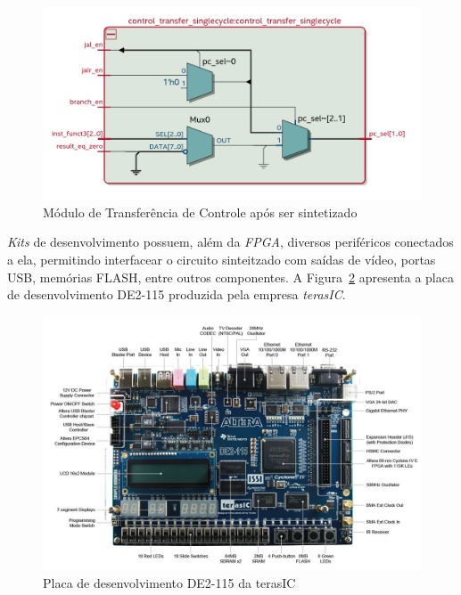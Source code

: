 \begin{figure}[H]
\centering
    \includegraphics[width=1\linewidth]{images/riscv_sinth.png}
    \caption{Módulo de Transferência de Controle após ser sintetizado
                }\label{fig:riscv_sinth}
\end{figure}

{
    \textit{Kits} de desenvolvimento possuem, além da \textit{FPGA}, diversos
    periféricos conectados a ela, permitindo interfacear o circuito sinteitzado
    com saídas de vídeo, portas USB, memórias FLASH, entre outros componentes.
    A Figura~\ref{fig:DE2_115} apresenta a placa de desenvolvimento DE2-115
    produzida pela empresa \textit{terasIC}.
}

\begin{figure}[H]
\centering
    \includegraphics[width=1\linewidth]{images/DE2_115.jpg}
    \caption{Placa de desenvolvimento DE2-115 da terasIC
                }\label{fig:DE2_115}
\end{figure}

